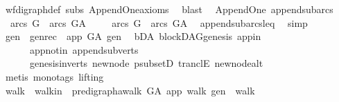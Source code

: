 \begin{isabellebody}
\ wf{\isacharunderscore}{\kern0pt}digraph{\isacharunderscore}{\kern0pt}def\ subs\ Append{\isacharunderscore}{\kern0pt}One{\isacharunderscore}{\kern0pt}axioms\ \isamarkupfalse%
\ blast%
\endisatagproof
{\isafoldproof}%
%
\isadelimproof
\isanewline
%
\endisadelimproof
\isanewline
{}\isamarkupfalse%
\ {\isacharparenleft}{\kern0pt}\ Append{\isacharunderscore}{\kern0pt}One{\isacharparenright}{\kern0pt}\ append{\isacharunderscore}{\kern0pt}subarcs{\isacharcolon}{\kern0pt}\ \isanewline
\ \ {\isachardoublequoteopen}arcs\ G\ {\isasymsubset}\ arcs\ G{\isacharunderscore}{\kern0pt}A{\isachardoublequoteclose}\isanewline
%
\isadelimproof
%
\endisadelimproof
%
\isatagproof
{}\isamarkupfalse%
\isanewline
\ \ \isamarkupfalse%
\ \ {\isachardoublequoteopen}arcs\ G\ {\isasymsubseteq}\ arcs\ G{\isacharunderscore}{\kern0pt}A{\isachardoublequoteclose}\ \isamarkupfalse%
\ append{\isacharunderscore}{\kern0pt}subarcs{\isacharunderscore}{\kern0pt}leq\ \isamarkupfalse%
\ simp\isanewline
\ \ \isamarkupfalse%
\ gen\ \ gen{\isacharunderscore}{\kern0pt}rec{\isacharcolon}{\kern0pt}\ {\isachardoublequoteopen}\ app\ {\isasymrightarrow}\isactrlsup {\isacharplus}{\kern0pt}\isactrlbsub G{\isacharunderscore}{\kern0pt}A\isactrlesub \ gen{\isachardoublequoteclose}\ \isamarkupfalse%
\ bD{\isacharunderscore}{\kern0pt}A\ blockDAG{\isachardot}{\kern0pt}genesis\ app{\isacharunderscore}{\kern0pt}in\isanewline
\ \ \ \ \ \ app{\isacharunderscore}{\kern0pt}notin\ append{\isacharunderscore}{\kern0pt}subverts\isanewline
\ \ \ \ \ \ genesis{\isacharunderscore}{\kern0pt}in{\isacharunderscore}{\kern0pt}verts\ new{\isacharunderscore}{\kern0pt}node\ psubsetD\ tranclE\ new{\isacharunderscore}{\kern0pt}node{\isacharunderscore}{\kern0pt}alt\isanewline
\ \ \ \ \isamarkupfalse%
\ {\isacharparenleft}{\kern0pt}metis\ {\isacharparenleft}{\kern0pt}mono{\isacharunderscore}{\kern0pt}tags{\isacharcomma}{\kern0pt}\ lifting{\isacharparenright}{\kern0pt}{\isacharparenright}{\kern0pt}\isanewline
\ \ \isamarkupfalse%
\ \isamarkupfalse%
\ walk\ \ walk{\isacharunderscore}{\kern0pt}in{\isacharcolon}{\kern0pt}\ {\isachardoublequoteopen}\ pre{\isacharunderscore}{\kern0pt}digraph{\isachardot}{\kern0pt}awalk\ G{\isacharunderscore}{\kern0pt}A\ app\ walk\ gen\ {\isasymand}\ walk\ {\isasymnoteq}\ {\isacharbrackleft}{\kern0pt}{\isacharbrackright}{\kern0pt}{\isachardoublequoteclose}\ \isanewline
\ \ \ \ \isamarkupfalse%

\end{isabellebody}
